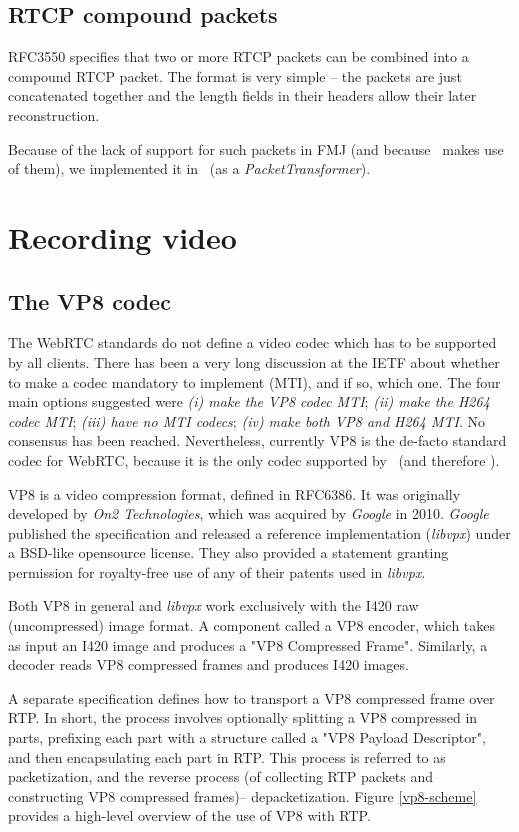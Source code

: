 \documentclass[twoside,openright,a4paper,12pt,english]{article}
\begin{document}
\subsection{RTCP compound packets}
RFC3550 specifies that two or more RTCP packets can be combined into a compound
RTCP packet. The format is very simple -- the packets are just concatenated
together and the length fields in their headers allow their later
reconstruction.

Because of the lack of support for such packets in FMJ (and because \wrtc\
makes use of them), we implemented it in \lj\ (as a \emph{PacketTransformer}).




\section{Recording video}
\label{recording-video}
\subsection{The VP8 codec}
The WebRTC standards do not define a video codec which has to be supported by all clients. There
has been a very long discussion at the IETF
about whether to make a codec mandatory to implement (MTI), and if so, which one. The
four main options suggested were
\emph{(i) make the VP8 codec MTI};
\emph{(ii) make the H264 codec MTI};
\emph{(iii) have no MTI codecs};
\emph{(iv) make both VP8 and H264 MTI}. No consensus has been reached.
Nevertheless, currently VP8 is the de-facto standard codec for WebRTC, because
it is the only codec supported by \wrtc\ (and therefore \jm).


VP8 is a video compression format, defined in RFC6386\cite{vp8}. It was
originally developed by \emph{On2 Technologies}, which was acquired by
\emph{Google} in 2010. \emph{Google} published the specification and released a
reference implementation (\emph{libvpx}) under a BSD-like opensource
license. They also provided a statement granting permission for royalty-free
use of any of their patents used in
\emph{libvpx}\cite{webm-ip-rights}.


Both VP8 in general and \emph{libvpx} work exclusively with the I420 raw
(uncompressed) image format\cite{i420}.
A component called a VP8 encoder, which takes as input an I420 image and produces a "VP8
Compressed Frame". Similarly, a decoder reads VP8 compressed frames and
produces I420 images.

A separate specification\cite{vp8rtp} defines how to transport a VP8 compressed
frame over RTP. In short, the process involves optionally splitting a VP8
compressed in parts, prefixing each part with a structure called a "VP8 Payload
Descriptor", and then encapsulating each part in RTP. This process is referred
to
as packetization, and the reverse process (of collecting RTP packets and
constructing VP8 compressed frames)-- depacketization. Figure \ref{vp8-scheme}
provides a high-level overview of the use of VP8 with RTP.
\end{document}
